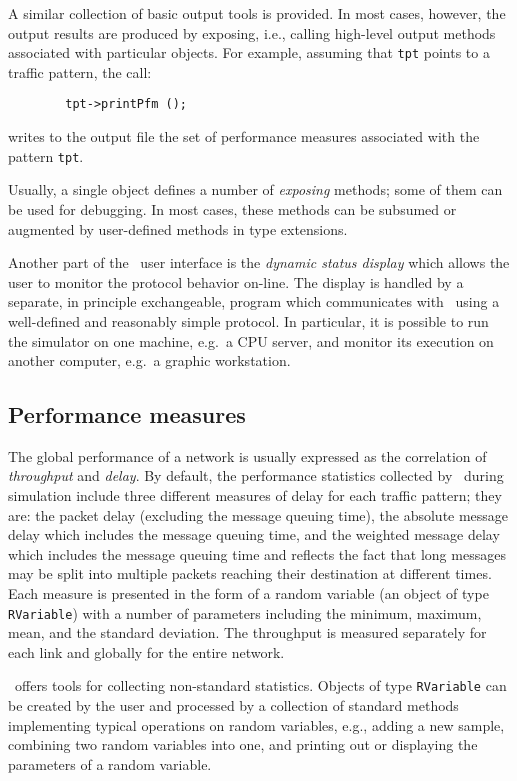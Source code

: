 A similar collection of basic output tools is provided.
In most cases, however, the output results are produced by exposing, i.e.,
calling high-level
output methods associated with particular objects.
For example, assuming that {\tt tpt} points to a traffic pattern,
the call:
{\small
\begin{verbatim}
        tpt->printPfm ();
\end{verbatim} }
\noindent
writes to the output file the set of performance measures associated with
the pattern {\tt tpt}.

Usually, a single object defines a number of {\em exposing\/} methods;
some of them can be used for debugging.
In most cases, these methods can be subsumed or augmented by user-defined
methods in type extensions.

Another part of the \smurph\ user interface is the
{\em dynamic status display\/}
which allows the user to monitor the protocol behavior on-line.
The display is handled by a separate, in principle exchangeable, program
which communicates
with \smurph\ using a well-defined and reasonably simple protocol.
In particular, it is possible to run the simulator on one machine, e.g.\ 
a CPU server, and monitor its execution on another computer, e.g.\ 
a graphic workstation.

\subsection{Performance measures}

The global performance of a network is usually expressed as the correlation
of {\em throughput} and {\em delay}.
By default,
the performance statistics collected by \smurph\ during simulation
include three different measures of delay for each traffic pattern; they are:
the packet delay (excluding the message queuing time),
the absolute message delay which includes the message queuing time, and
the weighted message delay which includes the message queuing
time and reflects the fact that long messages may be split into multiple
packets reaching their destination at different times.
Each measure is presented in the form of a random variable (an object of
type {\tt RVariable}) with a number of
parameters including the minimum, maximum, mean, and the standard
deviation.
The throughput is measured separately for each link and globally for the
entire network.

\smurph\ offers tools for collecting non-standard statistics.
Objects of type {\tt RVariable} can be created by the user and processed by
a collection of standard methods implementing typical operations
on random variables, e.g., adding a new sample,
combining two random variables into one, and printing out or displaying the
parameters of a random variable.


